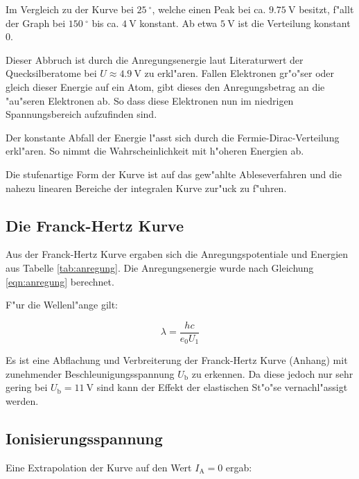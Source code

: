 Im Vergleich zu der Kurve bei $\SI{25}{^\circ}$, welche einen Peak bei ca. $\SI{9.75}{\volt}$ besitzt, f"allt der Graph bei $\SI{150}{^\circ}$ bis ca. $\SI{4}{\volt}$ konstant.
Ab etwa $\SI{5}{\volt}$ ist die Verteilung konstant $0$.

Dieser Abbruch ist durch die Anregungsenergie laut Literaturwert der Quecksilberatome bei $U \approx \SI{4.9}{\volt}$ zu erkl"aren.
Fallen Elektronen gr"o"ser oder gleich dieser Energie auf ein Atom, gibt dieses den Anregungsbetrag an die "au"seren Elektronen ab. So dass diese Elektronen nun im niedrigen Spannungsbereich aufzufinden sind.

Der konstante Abfall der Energie l"asst sich durch die Fermie-Dirac-Verteilung erkl"aren. So nimmt die Wahrscheinlichkeit mit h"oheren Energien ab.

Die stufenartige Form der Kurve ist auf das gew"ahlte Ableseverfahren und die nahezu linearen Bereiche der integralen Kurve zur"uck zu f"uhren.

\subsection{Die Franck-Hertz Kurve} %
\label{sub:die_franck_hertz_kurve}



Aus der Franck-Hertz Kurve ergaben sich die Anregungspotentiale und Energien aus Tabelle \ref{tab:anregung}. Die Anregungsenergie wurde nach Gleichung \eqref{eqn:anregung} berechnet.

F"ur die Wellenl"ange gilt:

\begin{equation}
	\lambda = \frac{h c}{e_\mathrm{0} U_\mathrm{1}}
\end{equation}

Es ist eine Abflachung und Verbreiterung der Franck-Hertz Kurve (Anhang) mit zunehmender Beschleunigungsspannung $U_\mathrm{b}$ zu erkennen. Da diese jedoch nur sehr gering bei $U_\mathrm{b} = \SI{11}{\volt}$ sind kann der Effekt der elastischen St"o"se vernachl"assigt werden.

\clearpage

\subsection{Ionisierungsspannung} %
\label{sub:ionisierungsspannung}

Eine Extrapolation der Kurve auf den Wert $I_\mathrm{A} = 0$ ergab:

